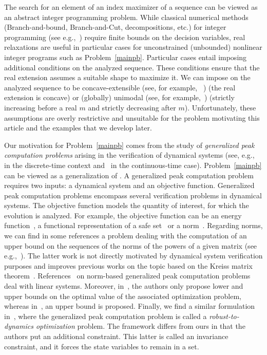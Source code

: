 \documentclass{article}
\def\blue#1{#1}
\begin{document}
	\blue{The search for an element of an index maximizer of a sequence can be viewed as an abstract integer programming problem. While classical numerical methods (Branch-and-bound, Branch-and-Cut, decompositions, etc.) for integer programming (see e.g.,~\cite{Bestuzheva2025,li2006nonlinear,misener2014antigone,ZHANG2023205}) require finite bounds on the decision variables, real relaxations are useful in particular cases for unconstrained (unbounded) nonlinear integer programs \blue{such} as Problem~\ref{mainpb}. Particular cases \blue{entail imposing} additional conditions on the analyzed sequence. These conditions ensure that the real extension assumes a suitable shape to maximize it. We can impose on the analyzed sequence to be concave-extensible (see, for example, ~\cite{murota2009recent}) (the real extension is concave) or (globally) unimodal (see, for example,~\cite{HASSIN2018795}) (strictly increasing before a real $m$ and strictly decreasing after $m$). Unfortunately, these assumptions are overly restrictive and unsuitable for the problem motivating this article and the examples that we develop later.
	} 
	
	Our motivation for Problem~\ref{mainpb} comes from the study of \emph{generalized peak computation problems} arising in the verification of dynamical systems (see, e.g.,~\cite{adje2015property,miller2021peakdiscrete} in the discrete-time context and~\cite{miller2020peaksafety} in the continuous-time case). Problem~\ref{mainpb} can be viewed as a generalization of \cite{DBLP:journals/jota/Adje21,adje13052025}. A generalized peak computation problem requires two inputs: a dynamical system and an objective function. Generalized peak computation problems encompass several verification problems in dynamical systems. The objective function models the quantity of interest, for which the evolution is analyzed. For example, the objective function can be an  
	energy function~\cite{4303250}, a functional representation of a safe 
	set~\cite{adje2015property,miller2020peaksafety} or a norm~\cite{ahiyevich2018upper,7984147}. Regarding norms, we can find in some references a problem dealing with the computation of an upper bound on the sequences of the norms of the powers of a given matrix (see e.g.,~\cite{dowler2013bounding}). The latter work is not directly motivated by dynamical system verification purposes and improves previous works on the topic based on the Kreiss matrix theorem~\cite{Kreiss1962,Spijker1991,TrefethenEmbree+2020}. References~\cite{ahiyevich2018upper,polyak2018peak,7984147} on norm-based generalized peak computation problems deal with linear systems. Moreover, in~\cite{polyak2018peak,7984147}, the authors only propose lower and upper bounds on the optimal value of the associated optimization problem, whereas in~\cite{ahiyevich2018upper}, an upper bound is proposed. Finally, we find a similar formulation in~\cite{ahmadi2025robust}, where the generalized peak computation problem is called a \emph{robust-to-dynamics optimization} problem. The framework differs from ours in that the authors put an additional constraint. This latter is called an invariance constraint, and it forces the state variables to remain in a set.   
	
\end{document}
